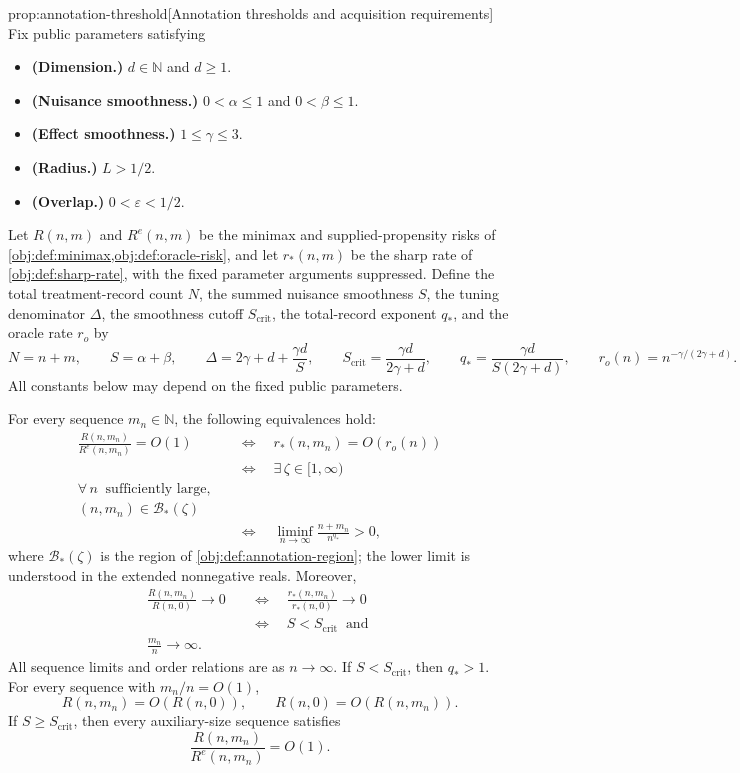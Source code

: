 \begin{propositionv}{prop:annotation-threshold}[Annotation thresholds and acquisition requirements]
Fix public parameters satisfying
\begin{itemize}
\item \textbf{(Dimension.)} \(d\in\mathbb N\) and \(d\ge1\).
\item \textbf{(Nuisance smoothness.)} \(0<\alpha\le1\) and \(0<\beta\le1\).
\item \textbf{(Effect smoothness.)} \(1\le\gamma\le3\).
\item \textbf{(Radius.)} \(L>1/2\).
\item \textbf{(Overlap.)} \(0<\varepsilon<1/2\).
\end{itemize}
Let \(R(n,m)\) and \(R^e(n,m)\) be the minimax and supplied-propensity risks of \cref{obj:def:minimax,obj:def:oracle-risk}, and let \(r_*(n,m)\) be the sharp rate of \cref{obj:def:sharp-rate}, with the fixed parameter arguments suppressed. Define the total treatment-record count \(N\), the summed nuisance smoothness \(S\), the tuning denominator \(\Delta\), the smoothness cutoff \(S_{\mathrm{crit}}\), the total-record exponent \(q_*\), and the oracle rate \(r_o\) by
\[
N=n+m,\qquad S=\alpha+\beta,\qquad
\Delta=2\gamma+d+\frac{\gamma d}{S},
\qquad
S_{\mathrm{crit}}=\frac{\gamma d}{2\gamma+d},
\qquad
q_*=\frac{\gamma d}{S(2\gamma+d)},
\qquad
r_o(n)=n^{-\gamma/(2\gamma+d)}.
\]
All constants below may depend on the fixed public parameters.

For every sequence \(m_n\in\mathbb N\), the following equivalences hold:
\[
\begin{aligned}
\frac{R(n,m_n)}{R^e(n,m_n)}=O(1)
&\quad\Longleftrightarrow\quad
r_*(n,m_n)=O(r_o(n))\\
&\quad\Longleftrightarrow\quad
\exists\,\zeta\in[1,\infty)\\ 
\forall\,n\ \text{ sufficiently large},\\
(n,m_n)\in\mathcal B_*(\zeta)\\
&\quad\Longleftrightarrow\quad
\liminf_{n\to\infty}\frac{n+m_n}{n^{q_*}}>0,
\end{aligned}
\]
where \(\mathcal B_*(\zeta)\) is the region of \cref{obj:def:annotation-region}; the lower limit is understood in the extended nonnegative reals. Moreover,
\[
\begin{aligned}
\frac{R(n,m_n)}{R(n,0)}\longrightarrow0
&\quad\Longleftrightarrow\quad
\frac{r_*(n,m_n)}{r_*(n,0)}\longrightarrow0\\
&\quad\Longleftrightarrow\quad
S<S_{\mathrm{crit}}
\ \text{ and }\\ 
\frac{m_n}{n}\longrightarrow\infty.
\end{aligned}
\]
All sequence limits and order relations are as \(n\to\infty\). If \(S<S_{\mathrm{crit}}\), then \(q_*>1\). For every sequence with \(m_n/n=O(1)\),
\[
R(n,m_n)=O(R(n,0)),
\qquad
R(n,0)=O(R(n,m_n)).
\]
If \(S\ge S_{\mathrm{crit}}\), then every auxiliary-size sequence satisfies
\[
\frac{R(n,m_n)}{R^e(n,m_n)}=O(1).
\]


\end{propositionv}

